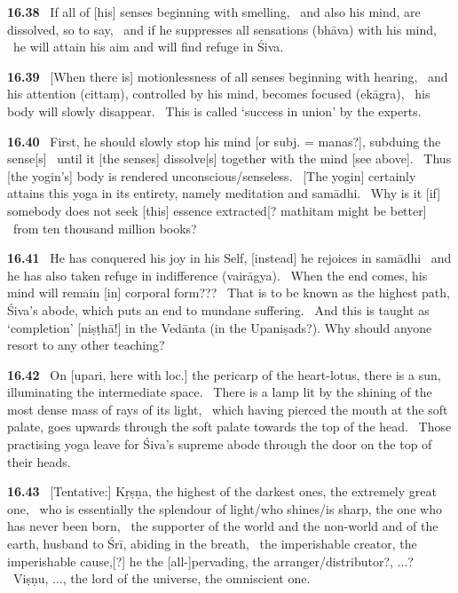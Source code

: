 \documentclass{article}
\begin{document}
\textbf{16.38}%
\ If all of [his] senses beginning with smelling,%
\ and also his mind, are dissolved, so to say,%
\ and if he suppresses all sensations (bhāva) with his mind,%
\ he will attain his aim and will find refuge in Śiva.%


\textbf{16.39}%
\ [When there is] motionlessness of all senses beginning with hearing,%
\ and his attention (cittaṃ), controlled by his mind, becomes focused (ekāgra),%
\ his body will slowly disappear.%
\ This is called `success in union' by the experts.%


\textbf{16.40}%
\ First, he should slowly stop his mind [or subj. = manas?], subduing the sense[s]%
\ until it [the senses] dissolve[s] together with the mind [see above].%
\                                 Thus [the yogin's] body is rendered unconscious/senseless.%
\ [The yogin] certainly attains this yoga in its entirety, namely meditation and samādhi.%
\ Why is it [if] somebody does not seek [this] essence extracted[? mathitam might be better]%
\                                 from ten thousand million books?%


\textbf{16.41}%
\ He has conquered his joy in his Self, [instead] he rejoices in samādhi%
\                         and he has also taken refuge in indifference (vairāgya).%
\ When the end comes, his mind will remain [in] corporal form???%
\ That is to be known as the highest path, Śiva's abode, which puts an end to mundane suffering.%
\ And this is taught as `completion' [niṣṭhā!] in the Vedānta (in the Upaniṣads?). Why should anyone resort to any other teaching?%


\textbf{16.42}%
\ On [upari, here with loc.] the pericarp of the heart-lotus, there is a sun, illuminating the intermediate space.%
\ There is a lamp lit by the shining of the most dense mass of rays of its light,%
\ which having pierced the mouth at the soft palate, goes upwards through the soft palate towards the top of the head.%
\ Those practising yoga leave for Śiva's supreme abode through the door on the top of their heads.%


\textbf{16.43}%
\ [Tentative:] Kṛṣṇa, the highest of the darkest ones, the extremely great one,%
\                         who is essentially the splendour of light/who shines/is sharp, the one who has never been born,%
\ the supporter of the world and the non-world and of the earth, husband to Śrī, abiding in the breath,%
\ the imperishable creator, the imperishable cause,[?] he the [all-]pervading, the arranger/distributor?, ...?%
\ Viṣṇu, ..., the lord of the universe, the omniscient one.%
\end{document}
